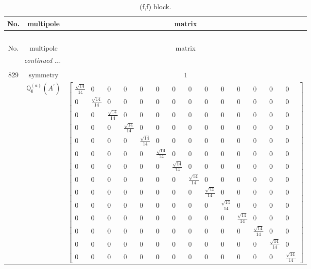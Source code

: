 \documentclass[fleqn,8pt,landscape]{jsarticle}
\begin{document}
\begin{longtable}{ccc}
\caption{(f,f) block.}
 \\
 \hline \hline
No. & multipole & matrix \\ \hline \endfirsthead

\multicolumn{2}{l}{\tablename\ \thetable{}} \\
 \hline \hline
No. & multipole & matrix \\ \hline \endhead

 \hline \hline
\multicolumn{2}{r}{\footnotesize\it continued ...} \\ \endfoot

 \hline \hline
\multicolumn{2}{r}{} \\ \endlastfoot

$ 829 $ & $ \text{symmetry} $ & $ 1 $ \\
$  $ & $ \mathbb{Q}_{0}^{(a)}(A^{\prime}) $ & $ \begin{bmatrix} \frac{\sqrt{14}}{14} & 0 & 0 & 0 & 0 & 0 & 0 & 0 & 0 & 0 & 0 & 0 & 0 & 0 \\ 0 & \frac{\sqrt{14}}{14} & 0 & 0 & 0 & 0 & 0 & 0 & 0 & 0 & 0 & 0 & 0 & 0 \\ 0 & 0 & \frac{\sqrt{14}}{14} & 0 & 0 & 0 & 0 & 0 & 0 & 0 & 0 & 0 & 0 & 0 \\ 0 & 0 & 0 & \frac{\sqrt{14}}{14} & 0 & 0 & 0 & 0 & 0 & 0 & 0 & 0 & 0 & 0 \\ 0 & 0 & 0 & 0 & \frac{\sqrt{14}}{14} & 0 & 0 & 0 & 0 & 0 & 0 & 0 & 0 & 0 \\ 0 & 0 & 0 & 0 & 0 & \frac{\sqrt{14}}{14} & 0 & 0 & 0 & 0 & 0 & 0 & 0 & 0 \\ 0 & 0 & 0 & 0 & 0 & 0 & \frac{\sqrt{14}}{14} & 0 & 0 & 0 & 0 & 0 & 0 & 0 \\ 0 & 0 & 0 & 0 & 0 & 0 & 0 & \frac{\sqrt{14}}{14} & 0 & 0 & 0 & 0 & 0 & 0 \\ 0 & 0 & 0 & 0 & 0 & 0 & 0 & 0 & \frac{\sqrt{14}}{14} & 0 & 0 & 0 & 0 & 0 \\ 0 & 0 & 0 & 0 & 0 & 0 & 0 & 0 & 0 & \frac{\sqrt{14}}{14} & 0 & 0 & 0 & 0 \\ 0 & 0 & 0 & 0 & 0 & 0 & 0 & 0 & 0 & 0 & \frac{\sqrt{14}}{14} & 0 & 0 & 0 \\ 0 & 0 & 0 & 0 & 0 & 0 & 0 & 0 & 0 & 0 & 0 & \frac{\sqrt{14}}{14} & 0 & 0 \\ 0 & 0 & 0 & 0 & 0 & 0 & 0 & 0 & 0 & 0 & 0 & 0 & \frac{\sqrt{14}}{14} & 0 \\ 0 & 0 & 0 & 0 & 0 & 0 & 0 & 0 & 0 & 0 & 0 & 0 & 0 & \frac{\sqrt{14}}{14} \end{bmatrix} $ \\ \hline

\end{longtable}
\end{document}
